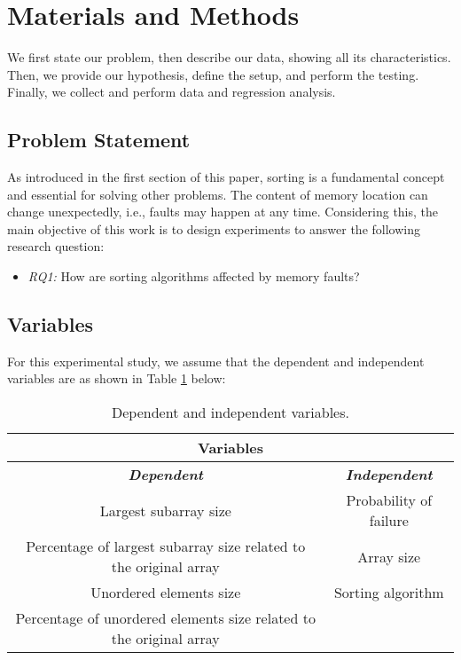 \section{Materials and Methods}

We first state our problem, then describe our data, showing all its characteristics. Then, we provide our hypothesis, define the setup, and perform the testing. Finally, we collect and perform data and regression analysis.

\subsection{Problem Statement}

As introduced in the first section of this paper, sorting is a fundamental concept and essential for solving other problems. The content of memory location can change unexpectedly, i.e., faults may happen at any time. Considering this, the main objective of this work is to design experiments to answer the following research question:

\begin{itemize}
    \item \textit{RQ1:} How are sorting algorithms affected by memory faults?
\end{itemize}

\subsection{Variables}

For this experimental study, we assume that the dependent and independent variables are as shown in Table \ref{table-variables} below:

\begin{table}[htbp]
    \caption{Dependent and independent variables.}
    \begin{center}
    \begin{tabular}{|c|c|}
    \hline
    \multicolumn{2}{|c|}{\textbf{Variables}}\\
    \hline
    \textbf{\textit{Dependent}} & \textbf{\textit{Independent}} \\
    \hline
    Largest subarray size & Probability of failure \\
    Percentage of largest subarray size related to the original array & Array size \\
    Unordered elements size & Sorting algorithm \\
    Percentage of unordered elements size related to the original array & \\
    \hline
    \end{tabular}
    \label{table-variables}
    \end{center}
\end{table}

